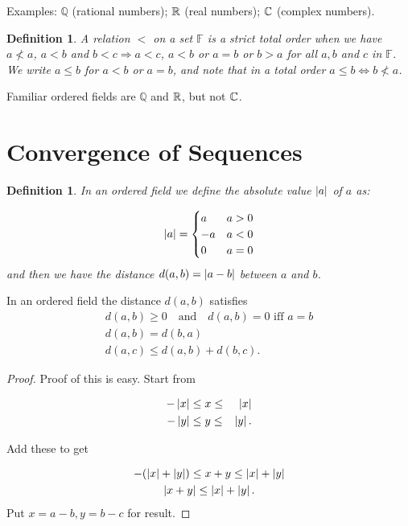 \documentclass{notes}
\theoremstyle{plain}
\newtheorem{definition}[proposition]{Definition}
\newcommand{\Q}{\mathbb{Q}}
\renewcommand{\F}{\mathbb{F}}
\begin{document}
Examples: $ \Q $ (rational numbers); $ \mathbb{R} $ (real numbers); $ \mathbb{C} 
$ (complex numbers).

\begin{definition}
\label{d1.2}
A relation $ < $ on a set $ \F $ is a \emph{strict total order} 
when we have $a \not< a$,  $a<b$ and $b < c  \Rightarrow a<c$, 
$a<b$ or $a=b$ or $b>a$
for all $ a,b $ and $ c $ in $ \F $.  We write $ a \leq b $ for $ a<b $
or $ a=b $, and note that in a total order $ a\leq b 
\Leftrightarrow b \not<a $.
\end{definition}

Familiar ordered fields are $ \Q $ and $ \mathbb{R} $, but not $ \mathbb{C} $.

\section{Convergence of Sequences}
\begin{definition}
\label{d1.3}
In an ordered field we define the \emph{absolute value} $ \left|a\right| $ of $ 
a $ as:

\[ \left|a\right| = \begin{cases}
a& a>0 \\
-a& a<0 \\
0& a=0
\end{cases} \]
and then we have the \emph{distance} $ 
d(a,b) = \left|a-b\right|$ between $ a $ and $ b $.
\end{definition}

In an ordered field the distance $ d(a,b) $ satisfies
\begin{gather*}
d(a,b) \geq 0 \quad \text{and} \quad d(a,b)=0 \text{ iff } a=b \\
d(a,b)=d(b,a) \\
d(a,c) \leq d(a,b)+d(b,c).
\end{gather*}

\begin{proof}
Proof of this is easy.  Start from

\begin{eqnarray*}
-\left|x\right| & \leq x \leq & \left|x\right| \cr
-\left|y\right| & \leq y \leq & \left|y\right|.
\end{eqnarray*}

Add these to get

\begin{gather*}
-(\left|x\right|+\left|y\right|)  \leq x+y \leq \left|x\right|+\left|y\right| \\
\left|x+y\right| \leq \left|x\right|+\left|y\right|.
\end{gather*}
 Put $ x=a-b, y=b-c $ for result.
\end{proof}
\end{document}
